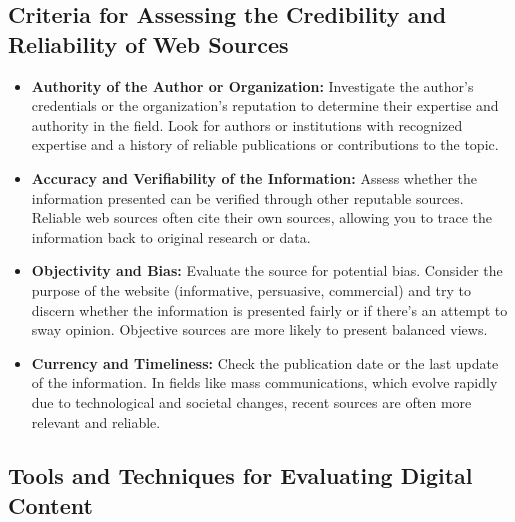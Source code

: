 \documentclass[
]{book}
\begin{document}
\hypertarget{criteria-for-assessing-the-credibility-and-reliability-of-web-sources}{%
\subsection*{Criteria for Assessing the Credibility and Reliability of Web Sources}\label{criteria-for-assessing-the-credibility-and-reliability-of-web-sources}}

\begin{itemize}
\item
  \textbf{Authority of the Author or Organization:} Investigate the author's credentials or the organization's reputation to determine their expertise and authority in the field. Look for authors or institutions with recognized expertise and a history of reliable publications or contributions to the topic.
\item
  \textbf{Accuracy and Verifiability of the Information:} Assess whether the information presented can be verified through other reputable sources. Reliable web sources often cite their own sources, allowing you to trace the information back to original research or data.
\item
  \textbf{Objectivity and Bias:} Evaluate the source for potential bias. Consider the purpose of the website (informative, persuasive, commercial) and try to discern whether the information is presented fairly or if there's an attempt to sway opinion. Objective sources are more likely to present balanced views.
\item
  \textbf{Currency and Timeliness:} Check the publication date or the last update of the information. In fields like mass communications, which evolve rapidly due to technological and societal changes, recent sources are often more relevant and reliable.
\end{itemize}

\hypertarget{tools-and-techniques-for-evaluating-digital-content}{%
\subsection*{Tools and Techniques for Evaluating Digital Content}\label{tools-and-techniques-for-evaluating-digital-content}}
\end{document}
